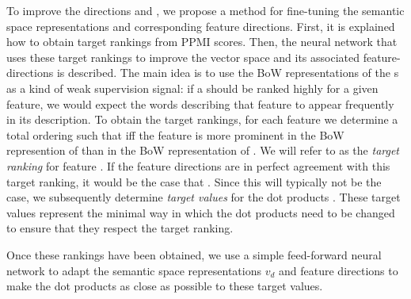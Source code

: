 



To improve the directions and , we propose a method for fine-tuning the semantic space representations and corresponding feature directions. First, it is explained how to obtain target rankings from PPMI scores. Then, the neural network that uses these target rankings to improve the vector space and its associated feature-directions is described. The main  idea is to use the BoW representations of the s as a kind of weak supervision signal: if a  should be ranked highly for a given feature, we would expect the words describing that feature to appear frequently in its description.
To obtain the target rankings, for each feature  we determine a total ordering  such that  iff the feature  is more prominent in the BoW represention of   than in the BoW representation of . We will refer to  as the \emph{target ranking} for feature . If the feature directions are in perfect agreement with this target ranking, it would be the case that . Since this will typically not be the case, we subsequently determine \emph{target values} for the dot products . These target values represent the minimal way in which the dot products need to be changed to ensure that they respect the target ranking.

Once these rankings have been obtained, we use a simple feed-forward neural network to adapt the semantic space representations $v_d$ and feature directions  to make the dot products  as close as possible to these target values. 


